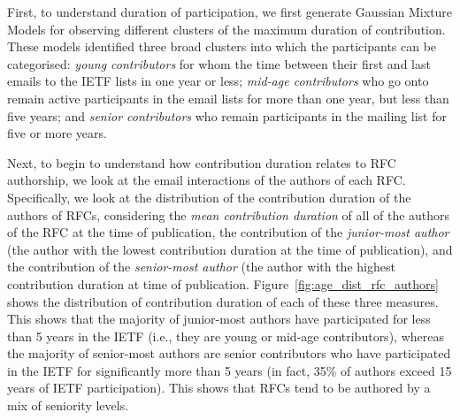 \documentclass[twocolumn,10pt]{article}
\begin{document}
First, to understand duration of participation, we first generate Gaussian
Mixture Models for observing different clusters of the maximum duration of
contribution. These models identified three broad clusters into which the
participants can be categorised: \emph{young contributors} for whom the
time between their first and last emails to the IETF lists in one year or
less; \emph{mid-age contributors} who go onto remain active participants in
the email lists for more than one year, but less than five years; and
\emph{senior contributors} who remain participants in the mailing list for
five or more years.

Next, to begin to understand how contribution duration relates to RFC
authorship, we look at the email interactions of the authors of each RFC.
Specifically, we look at the distribution of the contribution duration of
the authors of RFCs, considering the \emph{mean contribution duration} of
all of the authors of the RFC at the time of publication, the contribution
of the \emph{junior-most author} (the author with the lowest contribution
duration at the time of publication), and the contribution of the
\emph{senior-most author} (the author with the highest contribution
duration at time of publication.  Figure~\ref{fig:age_dist_rfc_authors}
shows the distribution of contribution duration of each of these three
measures. This shows that the majority of junior-most authors have
participated for less than 5 years in the IETF (i.e., they are young or
mid-age contributors), whereas the majority of senior-most authors are
senior contributors who have participated in the IETF for significantly
more than 5 years (in fact, 35\% of authors exceed 15 years of IETF
participation).  This shows that RFCs tend to be authored by a mix of
seniority levels.

\end{document}
